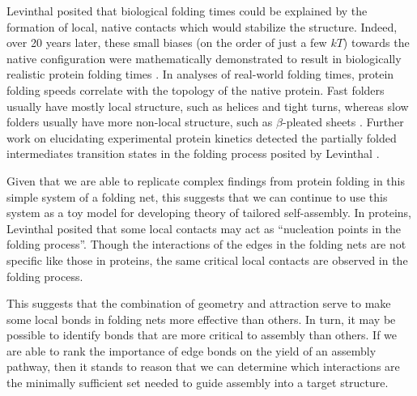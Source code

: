 Levinthal posited that biological folding times could be explained by the formation of local, native contacts which would stabilize the structure.
Indeed, over 20 years later, these small biases (on the order of just a few $kT$) towards the native configuration were mathematically demonstrated to result in biologically realistic protein folding times \cite{Zwanzig_1992_PNAS,Martinez_2014_JChemEd}.
In analyses of real-world folding times, protein folding speeds correlate with the topology of the native protein.
Fast folders usually have mostly local structure, such as helices and tight turns, whereas slow folders usually have more non-local structure, such as $\beta$-pleated sheets \cite{Plaxco_1998_JMolBio}.
Further work on elucidating experimental protein kinetics detected the partially folded intermediates transition states in the folding process posited by Levinthal \cite{Dill_2007_CurrOpinStructBio}. 


Given that we are able to replicate complex findings from protein folding in this simple system of a folding net, this suggests that we can continue to use this system as a toy model for developing theory of tailored self-assembly.
In proteins, Levinthal posited that some local contacts may act as ``nucleation points in the folding process''.
Though the interactions of the edges in the folding nets are not specific like those in proteins, the same critical local contacts are observed in the folding process.

This suggests that the combination of geometry and attraction serve to make some local bonds in folding nets more effective than others.
In turn, it may be possible to identify bonds that are more critical to assembly than others. 
If we are able to rank the importance of edge bonds on the yield of an assembly pathway, then it stands to reason that we can determine which interactions are the minimally sufficient set needed to guide assembly into a target structure. 


